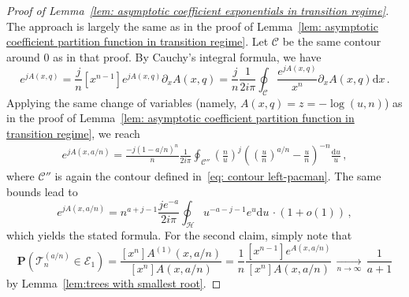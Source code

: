 \documentclass{article}
\theoremstyle{remark}
\newcommand{\cv}[1]{\,\underset{#1}{\longrightarrow}\,}
\newcommand{\cT}{\mathcal{T}}
\newcommand{\cH}{\mathcal{H}}
\newcommand{\cC}{\mathcal{C}}
\newcommand{\prob}[1]{\mathbf{P}{\left(#1\right)}}
\begin{document}
\begin{proof}[Proof of Lemma~\ref{lem: asymptotic coefficient exponentials in transition regime}]
    The approach is largely the same as in the proof of Lemma~\ref{lem: asymptotic coefficient partition function in transition regime}.
    Let $\cC$ be the same contour around $0$ as in that proof.
    By Cauchy's integral formula, we have
    \begin{equation*}
        [x^n] e^{jA(x,q)} = \frac{j}{n}[x^{n-1}] e^{jA(x,q)} \partial_x A(x,q) 
        = \frac{j}{n} \frac{1}{2i\pi} \oint_\cC \frac{e^{jA(x,q)}}{x^n} \partial_x A(x,q) \mathrm{d}x \,.
    \end{equation*}
    Applying the same change of variables (namely, $A(x,q) = z = - \log(u,n)$) as in the proof of Lemma~\ref{lem: asymptotic coefficient partition function in transition regime}, we reach 
    \begin{align*}
        [x^n] e^{jA(x,a/n)}
        = \frac{-j(1-a/n)^n}{n} \frac{1}{2i\pi} \oint_{\cC''} \left(\frac{n}{u}\right)^j \left( \left(\frac{u}{n}\right)^{a/n} - \frac{u}{n} \right)^{-n} \frac{\mathrm{d}u}{u}\,,
    \end{align*}
    where $\cC''$ is again the contour defined in~\eqref{eq: contour left-pacman}.
    The same bounds lead to
    \begin{equation*}
        [x^n]e^{jA(x,a/n)} = n^{a+j-1} \frac{je^{-a}}{2i\pi} \oint_\cH u^{-a-j-1} e^u \mathrm{d}u\,\cdot \left( 1 + o(1) \right) \,,
    \end{equation*}
    which yields the stated formula.
    For the second claim, simply note that
    \begin{equation*}
        \prob{ \cT_n^{(a/n)} \in \mathcal{E}_1 }
        = \frac{[x^n] A^{(1)}(x,a/n)}{[x^n] A(x,a/n)}
        = \frac{1}{n} \frac{[x^{n-1}] e^{A(x,a/n)}}{[x^n] A(x,a/n)}
        \cv{n\to\infty} \frac{1}{a+1}
    \end{equation*}
    by Lemma~\ref{lem:trees with smallest root}.
\end{proof}
\end{document}
